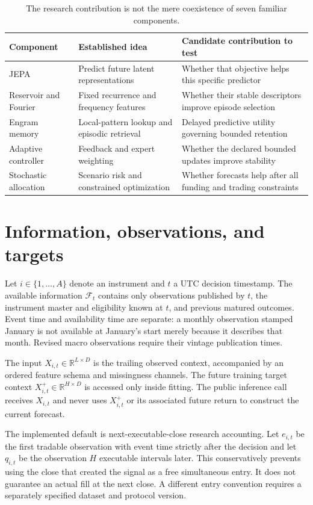 \documentclass[11pt,a4paper]{article}
\newcommand{\R}{\mathbb R}
\newcommand{\F}{\mathcal F}
\begin{document}
\begin{table}[ht]
\centering\small
\begin{tabularx}{\linewidth}{p{.23\linewidth}XX}
\toprule Component & Established idea & Candidate contribution to test \\
\midrule JEPA & Predict future latent representations & Whether that objective helps this specific predictor \\
Reservoir and Fourier & Fixed recurrence and frequency features & Whether their stable descriptors improve episode selection \\
Engram memory & Local-pattern lookup and episodic retrieval & Delayed predictive utility governing bounded retention \\
Adaptive controller & Feedback and expert weighting & Whether the declared bounded updates improve stability \\
Stochastic allocation & Scenario risk and constrained optimization & Whether forecasts help after all funding and trading constraints \\
\bottomrule
\end{tabularx}
\caption{The research contribution is not the mere coexistence of seven familiar components.}
\end{table}

\section{Information, observations, and targets}

Let $i\in\{1,\ldots,A\}$ denote an instrument and $t$ a UTC decision timestamp. The available information $\F_t$ contains only observations published by $t$, the instrument master and eligibility known at $t$, and previous matured outcomes. Event time and availability time are separate: a monthly observation stamped January is not available at January's start merely because it describes that month. Revised macro observations require their vintage publication times.

The input $X_{i,t}\in\R^{L\times D}$ is the trailing observed context, accompanied by an ordered feature schema and missingness channels. The future training target context $X^+_{i,t}\in\R^{H\times D}$ is accessed only inside fitting. The public inference call receives $X_{i,t}$ and never uses $X^+_{i,t}$ or its associated future return to construct the current forecast.

The implemented default is next-executable-close research accounting. Let $e_{i,t}$ be the first tradable observation with event time strictly after the decision and let $q_{i,t}$ be the observation $H$ executable intervals later. This conservatively prevents using the close that created the signal as a free simultaneous entry. It does not guarantee an actual fill at the next close. A different entry convention requires a separately specified dataset and protocol version.
\end{document}
